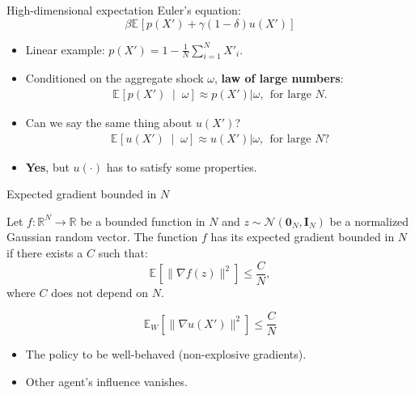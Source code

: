 \documentclass[aspectratio=169,10pt]{beamer}
\newcommand{\emphcolor}[1]{\textbf{\textcolor{emphcolorval}{#1}}}
\newcommand{\condexpec}[3][]{\ensuremath{\mathbb{E}_{#1}\left[{#2} \; \middle| \; {#3} \right]}}
\newcommand{\expec}[2][]{\ensuremath{\mathbb{E}_{{#1}}\left[ {#2} \right]}}
\begin{document}
\begin{frame}{High-dimensional expectation}
	Euler's equation:
	\begin{equation*}
		\beta \expec{p(X')+\gamma (1-\delta) u(X') }
	\end{equation*}
	\begin{itemize}
		\item Linear example: $p(X') = 1-\frac{1}{N} \sum_{i=1}^N X'_i$.
		\item Conditioned on the aggregate shock $\omega$, \emphcolor{law of large numbers}:
		\begin{align*}
		 \condexpec{p(X')}{\omega} \approx 	p(X')|\omega,  ~~\text{for large $N$}.
		\end{align*} 
		\item Can we say the same thing about $u(X')$? 
		\begin{align*}
			\condexpec{u(X')}{\omega} \approx 	u(X')|\omega,  ~~\text{for large $N$}?
		\end{align*} 
		\item \emphcolor{Yes}, but $u(\cdot)$ has to satisfy some properties.
	\end{itemize}
\end{frame}	
		
		
		
\begin{frame}{Expected gradient bounded in $N$}
	\begin{definition} Let $f:\mathbb{R}^N\rightarrow \mathbb{R}$ be a bounded function in $N$ and $z\sim \mathcal{N}(\mathbf{0}_N,\mathbf{I}_N)$ be a normalized Gaussian random vector. The function $f$ has its expected gradient bounded in $N$ if there exists a $C$ such that:
		\begin{equation*}
			\expec{\|\nabla f(z)\|^2} \leq \frac{C}{N},
		\end{equation*}
		where $C$ does not depend on $N$.
	\end{definition}	
$$ \mathbb{E}_W \left[\|\nabla u(X')\|^2\right] \leq \frac{C}{N}$$
\begin{itemize}
	\item The policy to be well-behaved (non-explosive gradients).\vspace{0.1in}
	\item Other agent's influence vanishes.
\end{itemize}
\end{frame}
		
\end{document}
